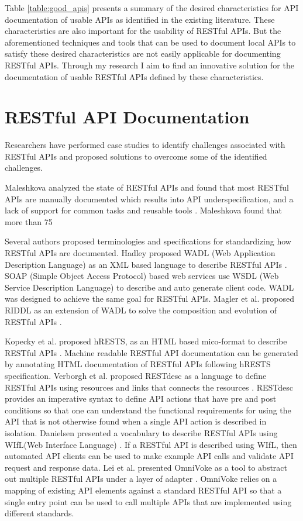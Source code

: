 \documentclass[11pt,oneside]{book}
\begin{document}
Table \ref{table:good_apis} presents a summary of the desired characteristics for API documentation of usable APIs as identified in the existing literature. These characteristics are also important for the usability of RESTful APIs. But the aforementioned techniques and tools that can be used to document local APIs to satisfy these desired characteristics are not easily applicable for documenting RESTful APIs. Through my research I aim to find an innovative solution for the documentation of usable RESTful APIs defined by these characteristics.

\section{RESTful API Documentation} %
Researchers have performed case studies to identify challenges associated with RESTful APIs and proposed solutions to overcome some of the identified challenges.

Maleshkova analyzed the state of RESTful APIs and found that most RESTful APIs are manually documented which results into API underspecification, and a lack of support for common tasks and reusable tools \cite{Maleshkova_investigating}. Maleshkova found that more than 75%

Several authors proposed terminologies and specifications for standardizing how RESTful APIs are documented. Hadley proposed WADL (Web Application Description Language) as an XML based language to describe RESTful APIs \cite{hadley2006web}. SOAP (Simple Object Access Protocol) based web services use WSDL (Web Service Description Language) to describe and auto generate client code. WADL was designed to achieve the same goal for RESTful APIs. Magler et al. proposed RIDDL as an extension of WADL to solve the composition and evolution of RESTful APIs \cite{mangler2010origin}.

Kopecky et al. proposed hRESTS, as an HTML based mico-format to describe RESTful APIs \cite{Kopecky_hrests}. Machine readable RESTful API documentation can be generated by annotating HTML documentation of RESTful APIs following hRESTS specification. Verborgh et al. proposed RESTdesc as a language to define RESTful APIs using resources and links that connects the resources \cite{RESTdesc}. RESTdesc provides an imperative syntax to define API actions that have pre and post conditions so that one can understand the functional requirements for using the API that is not otherwise found when a single API action is described in isolation. Danielsen presented a vocabulary to describe RESTful APIs using WIfL(Web Interface Language) \cite{Danielsen_validation}. If a RESTful API is described using WIfL, then automated API clients can be used to make  example API calls and validate API request and response data. Lei et al. presented OmniVoke as a tool to abstract out multiple RESTful APIs under a layer of adapter \cite{Ning_omnivoke}. OmniVoke relies on a mapping of existing API elements against a standard RESTful API so that a single entry point can be used to call multiple APIs that are implemented using different standards.
\end{document}
